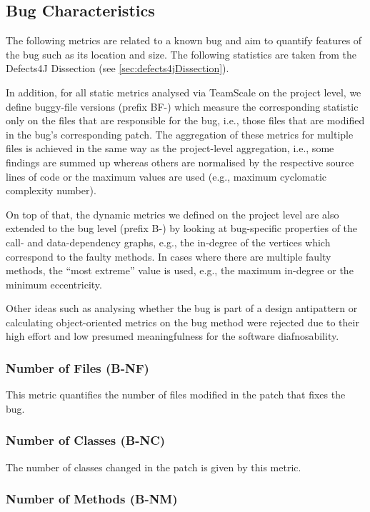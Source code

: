 \subsection{Bug Characteristics}

The following metrics are related to a known bug and aim to quantify features of
the bug such as its location and size. The following  statistics are taken from
the Defects4J Dissection (see \ref{sec:defects4jDissection}).

In addition, for all static metrics analysed via TeamScale on the project level,
we define buggy-file versions (prefix BF-) which measure the corresponding
statistic only on the files that are responsible for the bug, i.e., those files
that are modified in the bug's corresponding patch. The aggregation of these
metrics for multiple files is achieved in the same way as the project-level
aggregation, i.e., some findings are summed up whereas others are normalised by
the respective source lines of code or the maximum values are used (e.g.,
maximum cyclomatic complexity number).

On top of that, the dynamic metrics we defined on the project level are also
extended to the bug level (prefix B-) by looking at bug-specific properties of
the call- and data-dependency graphs, e.g., the in-degree of the vertices which
correspond to the faulty methods. In cases where there are multiple faulty
methods, the \enquote{most extreme} value is used, e.g., the maximum in-degree
or the minimum eccentricity.

Other ideas such as analysing whether the bug is part of a design antipattern or
calculating object-oriented metrics on the bug method were rejected due to their
high effort and low presumed meaningfulness for the software diafnosability.

\subsubsection{Number of Files (B-NF)}

This metric quantifies the number of files modified in the patch that fixes the
bug.

\subsubsection{Number of Classes (B-NC)}

The number of classes changed in the patch is given by this metric.

\subsubsection{Number of Methods (B-NM)}


